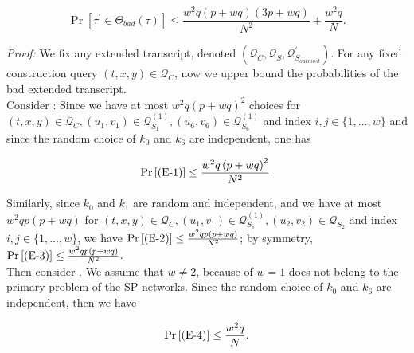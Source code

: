 \begin{equation}
\operatorname{Pr}[\tau^{\prime} \in \Theta_{bad}(\tau)] \leq \frac{w^2 q (p+w q) (3 p +w q)}{N^{2}} + \frac{w^{2} q}{N}.
\end{equation}

\noindent \emph{Proof:} We fix any extended transcript, denoted $\left(\mathcal{Q}_{C}, \mathcal{Q}_{S}, \mathcal{Q}_{S_{outmost}}^{\prime}\right)$. For any fixed construction query $(t, x, y) \in \mathcal{Q}_{C}$, now we upper bound the probabilities of the bad extended transcript.\\

\noindent Consider \eone: Since we have at most $w^{2} q \left(p+w q\right)^{2}$ choices for $(t, x, y) \in \mathcal{Q}_{C}, \left(u_{1}, v_{1}\right) \in \mathcal{Q}_{S_{1}}^{(1)}, \left(u_{6}, v_{6}\right) \in \mathcal{Q}_{S_{6}}^{(1)}$ and index $i, j \in \{1, \ldots, w\}$ and since the random choice of $k_{0}$ and $k_{6}$ are independent, one has

$$
\operatorname{Pr}\left[\text{(E-1)}\right] \leq \frac{w^{2} q \left(p+w q\right)^{2}}{N^{2}}.
$$

\noindent Similarly, since $k_{0}$ and $k_{1}$ are random and independent, and we have at most $w^{2} q p \left(p+w q\right)$ for $(t, x, y) \in \mathcal{Q}_{C}, \left(u_{1}, v_{1}\right) \in \mathcal{Q}_{S_{1}}^{(1)}, \left(u_{2}, v_{2}\right) \in \mathcal{Q}_{S_{2}}$ and index $i, j \in \{1, \ldots, w\}$, we have $\operatorname{Pr}\left[\text{(E-2)}\right] \leq \frac{w^{2} q p \left(p+w q\right)}{N^{2}}$; by symmetry, $\operatorname{Pr}\left[\text{(E-3)}\right] \leq \frac{w^{2} q p \left(p+w q\right)}{N^{2}}$. \\

\noindent Then consider \bfour. We assume that $w \neq 2$, because of $w = 1$ does not belong to the primary problem of the SP-networks. Since the random choice of $k_{0}$ and $k_{6}$ are independent, then we have

$$
\operatorname{Pr}\left[\text{(E-4)}\right] \leq \frac{w^{2} q}{N}.
$$

